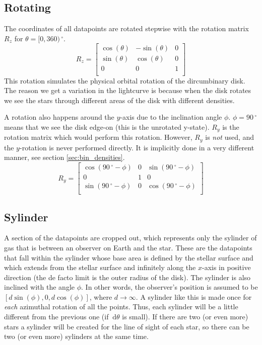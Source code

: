\documentclass[a4paper, 12pt, english, titlepage]{article}
\newcommand{\D}[1]{\ \mathrm{d}#1} %
\newcommand{\degree}{\, ^\circ}    %
\begin{document}
\subsection{Rotating}
    \label{sec:rotating}
    The coordinates of all datapoints are rotated stepwise with the rotation
    matrix $R_z$ for $\theta = [0, 360)\degree$.
    $$
    R_z = \begin{bmatrix}
        \cos(\theta) & -\sin(\theta) &              0 \\
        \sin(\theta) &  \cos(\theta) &              0 \\
                   0 &             0 &              1 \\
    \end{bmatrix}
    $$
    This rotation simulates the physical orbital rotation of the dircumbinary
    disk. The reason we get a variation in the lightcurve is because when the
    disk rotates we see the stars through different areas of the disk with
    different densities.

    A rotation also happens around the $y$-axis due to the inclination angle $\phi$. $\phi=90\degree$ means that we see the disk edge-on (this is the unrotated y-state). $R_y$ is the rotation matrix which would perform this rotation. However, $R_y$ is \emph{not} used, and the $y$-rotation is never performed directly. It is implicitly done in a very different manner, see section \vref{sec:bin_densities}.
    $$
    R_y = \begin{bmatrix}
        \cos(90\degree - \phi) &          0 & \sin(90\degree-\phi) \\
                             0 &          1 &                    0 \\
        \sin(90\degree - \phi) &          0 & \cos(90\degree-\phi) \\
    \end{bmatrix}
    $$

\subsection{Sylinder}
    A section of the datapoints are cropped out, which represents only the sylinder of gas that is between an observer on Earth and the star. These are the datapoints that fall within the sylinder whose base area is defined by the stellar surface and which extends from the stellar surface and infinitely along the $x$-axis in positive direction (the de facto limit is the outer radius of the disk). The sylinder is also inclined with the angle $\phi$. In other words, the observer's position is assumed to be $[d\sin(\phi), 0, d\cos(\phi)]$, where $d\rightarrow\infty$. A sylinder like this is made once for \emph{each} azimuthal rotation of all the points. Thus, each sylinder will be a little different from the previous one (if $\D\theta$ is small). If there are two (or even more) stars a sylinder will be created for the line of sight of each star, so there can be two (or even more) sylinders at the same time.
\end{document}
